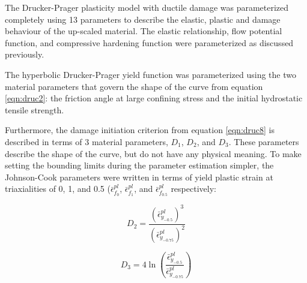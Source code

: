 The Drucker-Prager plasticity model with ductile damage was parameterized completely using 13 parameters to describe the elastic, plastic and damage behaviour of the up-scaled material. The elastic relationship, flow potential function, and compressive hardening function were parameterized as discussed previously. 

The hyperbolic Drucker-Prager yield function was parameterized using the two material parameters that govern the shape of the curve from equation \ref{eqn:druc2}: the friction angle at large confining stress and the initial hydrostatic tensile strength.




Furthermore, the damage initiation criterion from equation \ref{eqn:druc8} is described in terms of 3 material parameters, $D_1$, $D_2$, and $D_3$. These parameters describe the shape of the curve, but do not have any physical meaning. To make setting the bounding limits during the parameter estimation simpler, the Johnson-Cook parameters were written in terms of yield plastic strain at triaxialities of 0, 1, and 0.5 ($\bar{\epsilon}^{pl}_{f_0}$, $\bar{\epsilon}^{pl}_{f_1}$, and $\bar{\epsilon}^{pl}_{f_{0.5}}$ respectively:

\begin{equation}
D_2=\frac{\left(\bar{\epsilon}^{pl}_{y_{-0.5}}\right)^3}{\left(\bar{\epsilon}^{pl}_{y_{-0.75}}\right)^2}
\label{eqn:dparam8}
\end{equation}

\begin{equation}
D_3=4\ln \left (\frac{\bar{\epsilon}^{pl}_{y_{-0.5}}}{\bar{\epsilon}^{pl}_{y_{-0.75}}}\right )
\label{eqn:dparam9}
\end{equation}